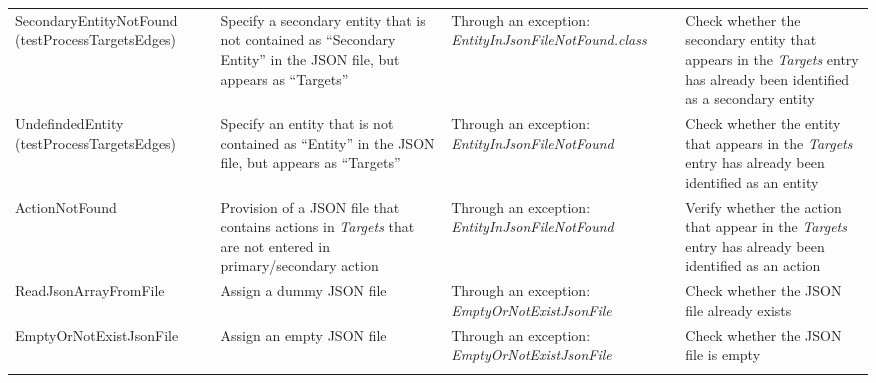 \begin{tabularx}{\textwidth}{X  X  X  X}
		SecondaryEntityNotFound \newline(testProcessTargetsEdges)&Specify a secondary entity that is not contained as \enquote{Secondary Entity} in the JSON file, but appears as \enquote{Targets}&Through an exception: \textit{EntityInJsonFileNotFound.class}&Check whether the secondary entity that appears in the \textit{Targets} entry has already been identified as a secondary entity\\
		
		UndefindedEntity (testProcessTargetsEdges) &Specify an entity that is not contained as \enquote{Entity} in the JSON file, but appears as \enquote{Targets}&Through an exception:  \textit{EntityInJsonFileNotFound}&Check whether the entity that appears in the \textit{Targets} entry has already been identified as an entity\\
		
		ActionNotFound&Provision of a JSON file that contains actions in \textit{Targets} that are not entered in primary/secondary action&Through an exception:  \textit{EntityInJsonFileNotFound}&Verify whether the action that appear in the \textit{Targets} entry has already been identified as an action\\
		
		ReadJsonArrayFromFile&Assign a dummy JSON file&Through an exception:  \textit{EmptyOrNotExistJsonFile}&Check whether the JSON file already exists\\
		
		EmptyOrNotExistJsonFile&Assign an empty JSON file&Through an exception: \textit{EmptyOrNotExistJsonFile}&Check whether the JSON file is empty\\
		\hline
		\caption{Test cases for RuleCreator  class}\label{tb:test_cases_rule_creator}
	\end{tabularx}

